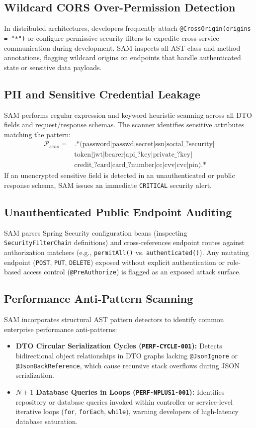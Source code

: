 \documentclass[conference]{IEEEtran}
\begin{document}
\subsection{Wildcard CORS Over-Permission Detection}
In distributed architectures, developers frequently attach \texttt{@CrossOrigin(origins = "*")} or configure permissive security filters to expedite cross-service communication during development. SAM inspects all AST class and method annotations, flagging wildcard origins on endpoints that handle authenticated state or sensitive data payloads.

\subsection{PII and Sensitive Credential Leakage}
SAM performs regular expression and keyword heuristic scanning across all DTO fields and request/response schemas. The scanner identifies sensitive attributes matching the pattern:
\begin{align*}
\mathcal{P}_{sens} = & \text{.*(password|passwd|secret|ssn|social\_?security|} \\
& \text{token|jwt|bearer|api\_?key|private\_?key|} \\
& \text{credit\_?card|card\_?number|cc|cvv|cvc|pin).*}
\end{align*}
If an unencrypted sensitive field is detected in an unauthenticated or public response schema, SAM issues an immediate \texttt{CRITICAL} security alert.

\subsection{Unauthenticated Public Endpoint Auditing}
SAM parses Spring Security configuration beans (inspecting \texttt{SecurityFilterChain} definitions) and cross-references endpoint routes against authorization matchers (e.g., \texttt{permitAll()} vs. \texttt{authenticated()}). Any mutating endpoint (\texttt{POST}, \texttt{PUT}, \texttt{DELETE}) exposed without explicit authentication or role-based access control (\texttt{@PreAuthorize}) is flagged as an exposed attack surface.

\subsection{Performance Anti-Pattern Scanning}
SAM incorporates structural AST pattern detectors to identify common enterprise performance anti-patterns:
\begin{itemize}
    \item \textbf{DTO Circular Serialization Cycles (\texttt{PERF-CYCLE-001}):} Detects bidirectional object relationships in DTO graphs lacking \texttt{@JsonIgnore} or \texttt{@JsonBackReference}, which cause recursive stack overflows during JSON serialization.
    \item \textbf{$N+1$ Database Queries in Loops (\texttt{PERF-NPLUS1-001}):} Identifies repository or database queries invoked within controller or service-level iterative loops (\texttt{for}, \texttt{forEach}, \texttt{while}), warning developers of high-latency database saturation.
\end{itemize}
\end{document}
